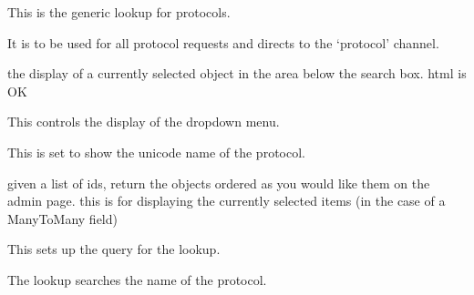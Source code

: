 \documentclass[letterpaper,10pt,english]{sphinxmanual}
\begin{document}
\begin{fulllineitems}
\label{api:experimentdb.data.lookups.ProtocolLookup}
This is the generic lookup for protocols.

It is to be used for all protocol requests and directs to the `protocol' channel.

\begin{fulllineitems}
\label{api:experimentdb.data.lookups.ProtocolLookup.format_item}
the display of a currently selected object in the area below the search box. html is OK

\end{fulllineitems}


\begin{fulllineitems}
\label{api:experimentdb.data.lookups.ProtocolLookup.format_result}
This controls the display of the dropdown menu.

This is set to show the unicode name of the protocol.

\end{fulllineitems}


\begin{fulllineitems}
\label{api:experimentdb.data.lookups.ProtocolLookup.get_objects}
given a list of ids, return the objects ordered as you would like them on the admin page.
this is for displaying the currently selected items (in the case of a ManyToMany field)

\end{fulllineitems}


\begin{fulllineitems}
\label{api:experimentdb.data.lookups.ProtocolLookup.get_query}
This sets up the query for the lookup.

The lookup searches the name of the protocol.

\end{fulllineitems}


\end{fulllineitems}
\end{document}
